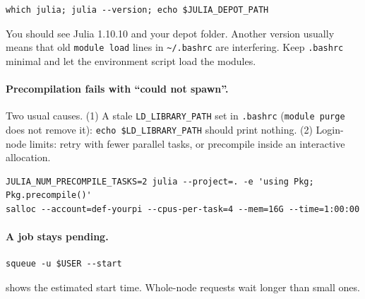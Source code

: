 \begin{lstlisting}
which julia; julia --version; echo $JULIA_DEPOT_PATH
\end{lstlisting}

You should see Julia 1.10.10 and your depot folder. Another version usually means that old
\texttt{module load} lines in \texttt{\textasciitilde/.bashrc} are interfering. Keep
\texttt{.bashrc} minimal and let the environment script load the modules.

\paragraph{Precompilation fails with ``could not spawn''.}
Two usual causes. (1) A stale \texttt{LD\_LIBRARY\_PATH} set in \texttt{.bashrc} (\texttt{module
purge} does not remove it): \texttt{echo \$LD\_LIBRARY\_PATH} should print nothing. (2) Login-node
limits: retry with fewer parallel tasks, or precompile inside an interactive allocation.

\begin{lstlisting}
JULIA_NUM_PRECOMPILE_TASKS=2 julia --project=. -e 'using Pkg; Pkg.precompile()'
salloc --account=def-yourpi --cpus-per-task=4 --mem=16G --time=1:00:00
\end{lstlisting}

\paragraph{A job stays pending.}
\begin{lstlisting}
squeue -u $USER --start
\end{lstlisting}
shows the estimated start time. Whole-node requests wait longer than small ones.
